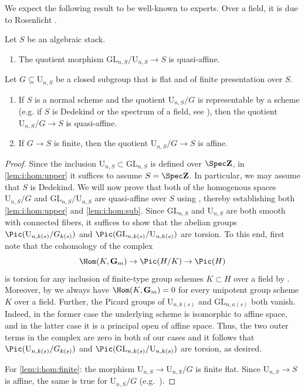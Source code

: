 \documentclass[reqno,a4paper]{amsart}
\numberwithin{Theorem}{section}
\renewcommand{\GL}{\mathrm{GL}}
\renewcommand{\U}{\mathrm{U}}
\theoremstyle{plain}
\theoremstyle{remark}
\begin{document}
We expect the following result to be well-known to experts. Over a field, it is due to
Rosenlicht \cite[Thm.~3]{MR0130878}.
\begin{proposition}
  \label{P:hom} Let $S$ be an algebraic stack.
  \begin{enumerate}
  \item \label{lem:i:hom:upper} The quotient morphism
    $\GL_{n,S}/\U_{n,S} \to S$ is quasi-affine. 
  \end{enumerate}
  Let $G \subseteq \U_{n,S}$ be a closed subgroup that is flat and of
  finite presentation over $S$.
  \begin{enumerate}[resume]
  \item \label{lem:i:hom:sub} If $S$ is a normal scheme
     and the quotient $\U_{n,S}/G$ is representable by a scheme (e.g. if $S$ is Dedekind or the spectrum of a field, see \cite[Rem.~VI${}_{\mathrm{B}}$.9.3(b)]{SGA3-I-NEW}), then the quotient $\U_{n,S}/G \to S$ is quasi-affine. 
  \item \label{lem:i:hom:finite} If $G \to S$ is finite, then the
    quotient $\U_{n,S}/G \to S$ is affine.
  \end{enumerate}
\end{proposition}
\begin{proof}
  Since the inclusion $\U_{n,S} \subset \GL_{n,S}$ is defined over
  $\Spec \mathbf{Z}$, in \eqref{lem:i:hom:upper} it suffices to assume
  $S=\Spec \mathbf{Z}$. In particular, we may assume that $S$ is
  Dedekind. We will now prove that both of the homogenous spaces
  $\U_{n,S}/G$ and $\GL_{n,S}/\U_{n,S}$ are quasi-affine over $S$
  using \cite[Thm.~VII.2.1]{Raynaud}, thereby establishing both
  \eqref{lem:i:hom:upper} and \eqref{lem:i:hom:sub}. Since $\GL_{n,S}$
  and $\U_{n,S}$ are both smooth with connected fibers, it suffices to
  show that the abelian groups $\Pic(\U_{n,k(s)}/G_{k(s)})$ and
  $\Pic(\GL_{n,k(s)}/\U_{n,k(s)})$ are torsion. To this end, first
  note that the cohomology of the complex
  \[
    \Hom(K,\mathbf{G}_m) \to \Pic(H/K) \to \Pic(H)
  \]
  is torsion for any inclusion of finite-type group schemes
  $K \subset H$ over a field by
  \cite[Thm.~VII.1.5]{Raynaud}. Moreover, by
  \cite[Prop.~XVII.2.4(ii)]{SGA3-II-NEW} we always have
  $\Hom(K,\mathbf{G}_m)=0$ for every unipotent group scheme $K$ over a
  field. Further, the Picard groups of $\U_{n,k(s)}$ and
  $\GL_{n,\kappa(s)}$ both vanish. Indeed, in the former case the
  underlying scheme is isomorphic to affine space, and in the latter case
  it is a principal open of affine space. Thus, the two outer terms in
  the complex are zero in both of our cases and it follows that
  $\Pic(\U_{n,k(s)}/G_{k(s)})$ and
  $\Pic(\GL_{n,k(s)}/\U_{n,k(s)})$ are torsion, as desired.

  For \eqref{lem:i:hom:finite}: the morphism $\U_{n,S} \to \U_{n,S}/G$
  is finite flat. Since $\U_{n,S} \to S$ is affine, the same is true
  for $\U_{n,S}/G$ (e.g.~\cite[Thm. 8.1]{rydh-2009}).
\end{proof}
\end{document}
